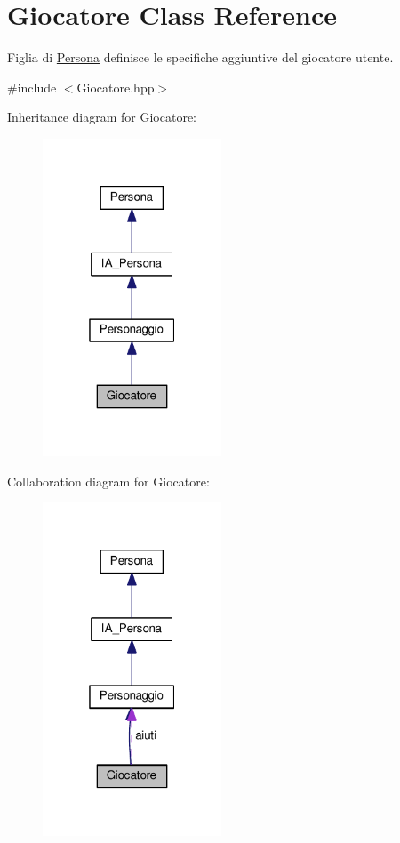 \hypertarget{classGiocatore}{}\section{Giocatore Class Reference}
\label{classGiocatore}


Figlia di \hyperlink{classPersona}{Persona} definisce le specifiche aggiuntive del giocatore utente.  




{\ttfamily \#include $<$Giocatore.\+hpp$>$}



Inheritance diagram for Giocatore\+:\nopagebreak
\begin{figure}[H]
\begin{center}
\leavevmode
\includegraphics[width=151pt]{classGiocatore__inherit__graph}
\end{center}
\end{figure}


Collaboration diagram for Giocatore\+:\nopagebreak
\begin{figure}[H]
\begin{center}
\leavevmode
\includegraphics[width=151pt]{classGiocatore__coll__graph}
\end{center}
\end{figure}
